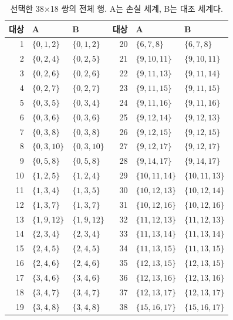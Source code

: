\documentclass[11pt,a4paper]{article}
\theoremstyle{definition}
\theoremstyle{remark}\newtheorem{remark}[theorem]{주석}
\begin{document}
\begin{table}[htbp]
\centering\small
\caption{선택한 38×18 쌍의 전체 행. A는 손실 세계, B는 대조 세계다.}\label{tab:witness38}
\begin{tabular}{rllrll}\toprule
대상 & A & B & 대상 & A & B\\\midrule
1 & $\{0,1,2\}$ & $\{0,1,2\}$ & 20 & $\{6,7,8\}$ & $\{6,7,8\}$\\
2 & $\{0,2,4\}$ & $\{0,2,5\}$ & 21 & $\{9,10,11\}$ & $\{9,10,11\}$\\
3 & $\{0,2,6\}$ & $\{0,2,6\}$ & 22 & $\{9,11,13\}$ & $\{9,11,14\}$\\
4 & $\{0,2,7\}$ & $\{0,2,7\}$ & 23 & $\{9,11,15\}$ & $\{9,11,15\}$\\
5 & $\{0,3,5\}$ & $\{0,3,4\}$ & 24 & $\{9,11,16\}$ & $\{9,11,16\}$\\
6 & $\{0,3,6\}$ & $\{0,3,6\}$ & 25 & $\{9,12,14\}$ & $\{9,12,13\}$\\
7 & $\{0,3,8\}$ & $\{0,3,8\}$ & 26 & $\{9,12,15\}$ & $\{9,12,15\}$\\
8 & $\{0,3,10\}$ & $\{0,3,10\}$ & 27 & $\{9,12,17\}$ & $\{9,12,17\}$\\
9 & $\{0,5,8\}$ & $\{0,5,8\}$ & 28 & $\{9,14,17\}$ & $\{9,14,17\}$\\
10 & $\{1,2,5\}$ & $\{1,2,4\}$ & 29 & $\{10,11,14\}$ & $\{10,11,13\}$\\
11 & $\{1,3,4\}$ & $\{1,3,5\}$ & 30 & $\{10,12,13\}$ & $\{10,12,14\}$\\
12 & $\{1,3,7\}$ & $\{1,3,7\}$ & 31 & $\{10,12,16\}$ & $\{10,12,16\}$\\
13 & $\{1,9,12\}$ & $\{1,9,12\}$ & 32 & $\{11,12,13\}$ & $\{11,12,13\}$\\
14 & $\{2,3,4\}$ & $\{2,3,4\}$ & 33 & $\{11,13,14\}$ & $\{11,13,14\}$\\
15 & $\{2,4,5\}$ & $\{2,4,5\}$ & 34 & $\{11,13,15\}$ & $\{11,13,15\}$\\
16 & $\{2,4,6\}$ & $\{2,4,6\}$ & 35 & $\{12,13,15\}$ & $\{12,13,15\}$\\
17 & $\{3,4,6\}$ & $\{3,4,6\}$ & 36 & $\{12,13,16\}$ & $\{12,13,16\}$\\
18 & $\{3,4,7\}$ & $\{3,4,7\}$ & 37 & $\{12,13,17\}$ & $\{12,13,17\}$\\
19 & $\{3,4,8\}$ & $\{3,4,8\}$ & 38 & $\{15,16,17\}$ & $\{15,16,17\}$\\
\bottomrule\end{tabular}

\end{table}
\end{document}
